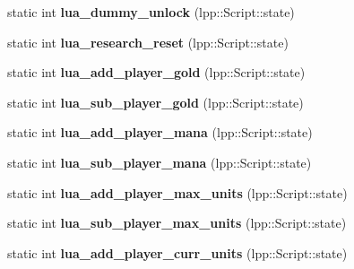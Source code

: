 \begin{DoxyCompactItemize}
\item 
static int {\bfseries lua\+\_\+dummy\+\_\+unlock} (lpp\+::\+Script\+::state)\hypertarget{class_lua_interface_a2bc524aa9267fdff3b60a82bd0a1612a}{}\label{class_lua_interface_a2bc524aa9267fdff3b60a82bd0a1612a}

\item 
static int {\bfseries lua\+\_\+research\+\_\+reset} (lpp\+::\+Script\+::state)\hypertarget{class_lua_interface_a4c3e1549dec1930376db2a6bf7cd206b}{}\label{class_lua_interface_a4c3e1549dec1930376db2a6bf7cd206b}

\item 
static int {\bfseries lua\+\_\+add\+\_\+player\+\_\+gold} (lpp\+::\+Script\+::state)\hypertarget{class_lua_interface_add74c7ab51055d169d9038c952c1db8a}{}\label{class_lua_interface_add74c7ab51055d169d9038c952c1db8a}

\item 
static int {\bfseries lua\+\_\+sub\+\_\+player\+\_\+gold} (lpp\+::\+Script\+::state)\hypertarget{class_lua_interface_a09084ca46d2f10f23c6e6ad1fca6c862}{}\label{class_lua_interface_a09084ca46d2f10f23c6e6ad1fca6c862}

\item 
static int {\bfseries lua\+\_\+add\+\_\+player\+\_\+mana} (lpp\+::\+Script\+::state)\hypertarget{class_lua_interface_ae53e0b9adaf1b6044601fcf41d5433f9}{}\label{class_lua_interface_ae53e0b9adaf1b6044601fcf41d5433f9}

\item 
static int {\bfseries lua\+\_\+sub\+\_\+player\+\_\+mana} (lpp\+::\+Script\+::state)\hypertarget{class_lua_interface_aa70677feb2885f84f85be89d5bf14fbf}{}\label{class_lua_interface_aa70677feb2885f84f85be89d5bf14fbf}

\item 
static int {\bfseries lua\+\_\+add\+\_\+player\+\_\+max\+\_\+units} (lpp\+::\+Script\+::state)\hypertarget{class_lua_interface_a03c7161314e4c848062fa3d95e0e7eb0}{}\label{class_lua_interface_a03c7161314e4c848062fa3d95e0e7eb0}

\item 
static int {\bfseries lua\+\_\+sub\+\_\+player\+\_\+max\+\_\+units} (lpp\+::\+Script\+::state)\hypertarget{class_lua_interface_a89acffaf0ff8e78a9ca845072a3417e8}{}\label{class_lua_interface_a89acffaf0ff8e78a9ca845072a3417e8}

\item 
static int {\bfseries lua\+\_\+add\+\_\+player\+\_\+curr\+\_\+units} (lpp\+::\+Script\+::state)\hypertarget{class_lua_interface_a4979edafed4f7cb20d73d5aeee80def1}{}\label{class_lua_interface_a4979edafed4f7cb20d73d5aeee80def1}


\end{DoxyCompactItemize}
